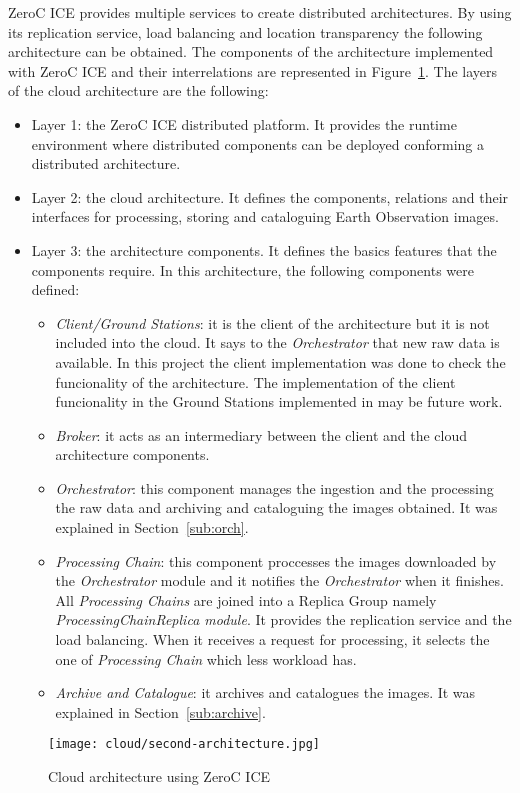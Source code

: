ZeroC ICE provides multiple services to create distributed
architectures. By using its replication service, load balancing and location
transparency the following architecture can be obtained.
The components of the architecture implemented with ZeroC ICE and their
interrelations are represented in Figure~\ref{fig:ice-architecture}. The layers
of the cloud architecture are the
following:
\begin{itemize}
\item Layer 1: the ZeroC ICE distributed platform. It provides the runtime environment
  where distributed components can be deployed conforming a distributed
  architecture.
\item Layer 2: the cloud architecture. It defines the components, relations and their
  interfaces for processing, storing and cataloguing Earth Observation images. 
\item Layer 3: the architecture components. It defines the basics features that
  the components require. In this architecture, the following components were defined:
\begin{itemize}
\item \emph{Client/Ground Stations}: it is the client of the architecture but it
  is not included into the cloud. It says to the \emph{Orchestrator} that new raw data is available. In this
  project the client implementation was done to check the funcionality of the
  architecture. The implementation of the client
  funcionality in the Ground Stations implemented in \vw may be future work.
\item \emph{Broker}: it acts as an intermediary between the client and the cloud architecture
  components. 
\item \emph{Orchestrator}: this component manages the ingestion and the
  processing the raw data and archiving and cataloguing the images obtained. It was explained in Section~\ref{sub:orch}.
\item \emph{Processing Chain}: this component proccesses the images downloaded by the
  \emph{Orchestrator} module and it notifies the \emph{Orchestrator} when it
  finishes. All \emph{Processing Chains} are joined into a Replica Group namely
  \emph{ProcessingChainReplica module}. It provides the replication service and the load
  balancing. When it receives a request for processing, it selects the one of \emph{Processing Chain} which less workload has.
\item \emph{Archive and Catalogue}: it archives and catalogues the images. It was explained in Section~\ref{sub:archive}.
\end{itemize}
\end{itemize}
\begin{figure}[!h]
\begin{center}
\texttt{[image: cloud/second-architecture.jpg]}
\caption{Cloud architecture using ZeroC ICE}
\label{fig:ice-architecture}
\end{center}
\end{figure}


